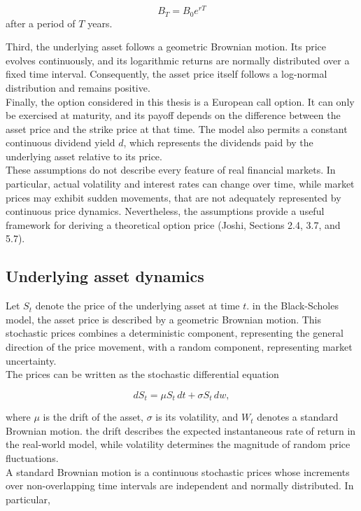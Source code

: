 \documentclass{article}
\begin{document}
	\[
	B_T = B_0 e^{rT}
	\]
	after a period of $T$ years.
	
	Third, the underlying asset follows a geometric Brownian motion. Its price evolves continuously, and its logarithmic returns are normally distributed over a fixed time interval. Consequently, the asset price itself follows a log-normal distribution and remains positive.\\
	Finally, the option considered in this thesis is a European call option. It can only be exercised at maturity, and its payoff depends on the difference between the asset price and the strike price at that time. The model also permits a constant continuous dividend yield $d$, which represents the dividends paid by the underlying asset relative to its price. \\
	These assumptions do not describe every feature of real financial markets. In particular, actual volatility and interest rates can change over time, while market prices may exhibit sudden movements, that are not adequately represented by continuous price dynamics. Nevertheless, the assumptions provide a useful framework for deriving a theoretical option price (Joshi, Sections 2.4, 3.7, and 5.7).
	
	\subsection{Underlying asset dynamics}
	
	Let $S_t$ denote the price of the underlying asset at time $t$. in the Black-Scholes model, the asset price is described by a geometric Brownian motion. This stochastic prices combines a deterministic component, representing the general direction of the price movement, with a random component, representing market uncertainty. \\
	The prices can be written as the stochastic differential equation
	
	\[
	dS_t = \mu S_t\,dt + \sigma S_t\,dw, 
	\]	
	
	where $\mu$ is the drift of the asset, $\sigma$ is its volatility, and $W_t$ denotes a standard Brownian motion. the drift describes the expected instantaneous rate of return in the real-world model, while volatility determines the magnitude of random price fluctuations.\\
	A standard Brownian motion is a continuous stochastic prices whose increments over non-overlapping time intervals are independent and normally distributed. In particular, 
	
\end{document}
